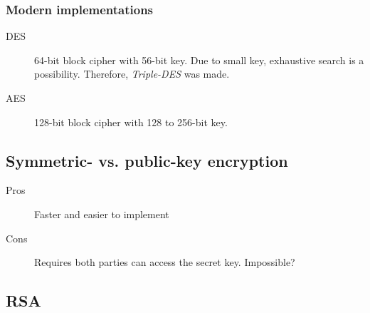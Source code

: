 \subsubsection{Modern implementations}
\begin{description}
\item[DES] 64-bit block cipher with 56-bit key. Due to small key,
  exhaustive search is a possibility. Therefore, \emph{Triple-DES} was
  made.
\item[AES] 128-bit block cipher with 128 to 256-bit key.
\end{description}

\subsection{Symmetric- vs. public-key encryption}
\begin{description}
\item[Pros] Faster and easier to implement
\item[Cons] Requires both parties can access the secret key. Impossible?
\end{description}

\subsection{RSA}
